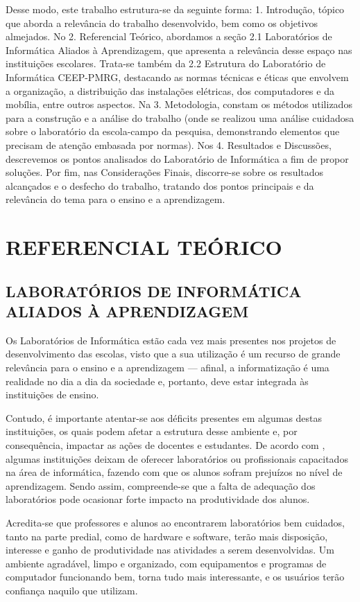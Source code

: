 \documentclass[12pt, openright, oneside, a4paper, brazil]{abntex2}
\begin{document}
	Desse modo, este trabalho estrutura-se da seguinte forma: 1. Introdução, tópico que aborda a relevância do trabalho desenvolvido, bem como os objetivos almejados. No 2. Referencial Teórico, abordamos a seção 2.1 Laboratórios de Informática Aliados à Aprendizagem, que apresenta a relevância desse espaço nas instituições escolares. Trata-se também da 2.2 Estrutura do Laboratório de Informática CEEP-PMRG, destacando as normas técnicas e éticas que envolvem a organização, a distribuição das instalações elétricas, dos computadores e da mobília, entre outros aspectos. Na 3. Metodologia, constam os métodos utilizados para a construção e a análise do trabalho (onde se realizou uma análise cuidadosa sobre o laboratório da escola-campo da pesquisa, demonstrando elementos que precisam de atenção embasada por normas). Nos 4. Resultados e Discussões, descrevemos os pontos analisados do Laboratório de Informática a fim de propor soluções. Por fim, nas Considerações Finais, discorre-se sobre os resultados alcançados e o desfecho do trabalho, tratando dos pontos principais e da relevância do tema para o ensino e a aprendizagem.
\newpage
\chapter{REFERENCIAL TEÓRICO}
\section{LABORATÓRIOS DE INFORMÁTICA ALIADOS À APRENDIZAGEM}

	Os Laboratórios de Informática estão cada vez mais presentes nos projetos de desenvolvimento das escolas, visto que a sua utilização é um recurso de grande relevância para o ensino e a aprendizagem — afinal, a informatização é uma realidade no dia a dia da sociedade e, portanto, deve estar integrada às instituições de ensino.

	Contudo, é importante atentar-se aos déficits presentes em algumas destas instituições, os quais podem afetar a estrutura desse ambiente e, por consequência, impactar as ações de docentes e estudantes. De acordo com , algumas instituições deixam de oferecer laboratórios ou profissionais capacitados na área de informática, fazendo com que os alunos sofram prejuízos no nível de aprendizagem. Sendo assim, compreende-se que a falta de adequação dos laboratórios pode ocasionar forte impacto na produtividade dos alunos.

\begin{citacao}
	Acredita-se que professores e alunos ao encontrarem laboratórios bem cuidados, tanto na parte predial, como de hardware e software, terão mais disposição, interesse e ganho de produtividade nas atividades a serem desenvolvidas. Um ambiente agradável, limpo e organizado, com equipamentos e programas de computador funcionando bem, torna tudo mais interessante, e os usuários terão confiança naquilo que utilizam. \cite[p.~22]{gripa2002}
\end{citacao}
\end{document}
